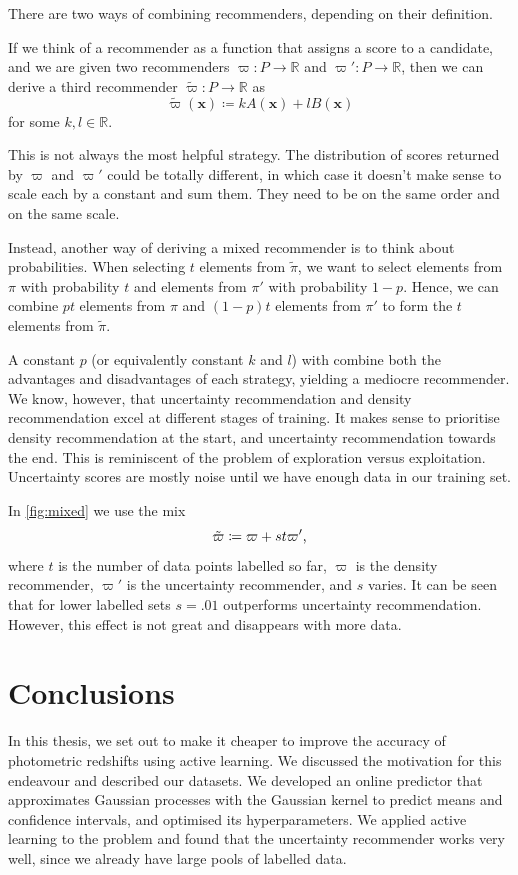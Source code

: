 \documentclass[11pt,twoside,openright]{report}
\newcommand\bbR{\mathbb{R}}
\newcommand\bx{\mathbf{x}}
\begin{document}
There are two ways of combining recommenders, depending on their definition.

If we think of a recommender as a function that assigns a score to a candidate, and we are given two recommenders $\varpi : P \to \bbR$ and $\varpi' : P \to \bbR$, then we can derive a third recommender $\tilde \varpi : P \to \bbR$ as \[
    \tilde\varpi(\bx) \coloneqq kA(\bx) + lB(\bx)
\] for some $k, l \in \bbR$.

This is not always the most helpful strategy. The distribution of scores returned by $\varpi$ and $\varpi'$ could be totally different, in which case it doesn't make sense to scale each by a constant and sum them. They need to be on the same order and on the same scale.

Instead, another way of deriving a mixed recommender is to think about probabilities. When selecting $t$ elements from $\tilde\pi$, we want to select elements from $\pi$ with probability $t$ and elements from $\pi'$ with probability $1-p$. Hence, we can combine $pt$ elements from $\pi$ and $(1-p)t$ elements from $\pi'$ to form the $t$ elements from $\tilde\pi$.

A constant $p$ (or equivalently constant $k$ and $l$) with combine both the advantages and disadvantages of each strategy, yielding a mediocre recommender. We know, however, that uncertainty recommendation and density recommendation excel at different stages of training. It makes sense to prioritise density recommendation at the start, and uncertainty recommendation towards the end. This is reminiscent of the problem of exploration versus exploitation. Uncertainty scores are mostly noise until we have enough data in our training set.

In \cref{fig:mixed} we use the mix \[
  \tilde \varpi \coloneqq \varpi + st\varpi'\text,
\] where $t$ is the number of data points labelled so far, $\varpi$ is the density recommender, $\varpi'$ is the uncertainty recommender, and $s$ varies. It can be seen that for lower labelled sets $s=.01$ outperforms uncertainty recommendation. However, this effect is not great and disappears with more data.

\chapter{Conclusions}
In this thesis, we set out to make it cheaper to improve the accuracy of photometric redshifts using active learning. We discussed the motivation for this endeavour and described our datasets. We developed an online predictor that approximates Gaussian processes with the Gaussian kernel to predict means and confidence intervals, and optimised its hyperparameters. We applied active learning to the problem and found that the uncertainty recommender works very well, since we already have large pools of labelled data.
\end{document}
